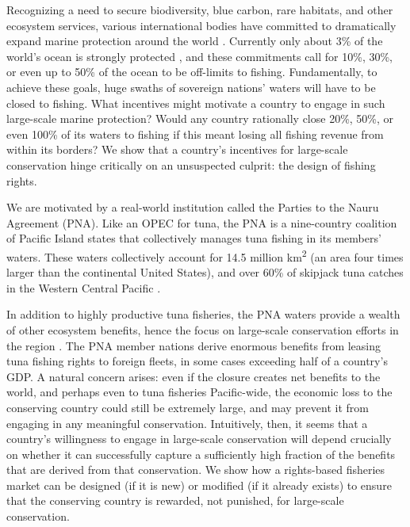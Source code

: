 \documentclass[12pt]{article}
\begin{document}



Recognizing a need to secure biodiversity, blue carbon, rare habitats, and other ecosystem services, various international bodies have committed to dramatically expand marine protection around the world \cite{dinerstein_2019}. Currently only about 3\% of the world's ocean is strongly protected \cite{sala_2018}, and these commitments call for 10\%, 30\%, or even up to 50\% of the ocean to be off-limits to fishing. Fundamentally, to achieve these goals, huge swaths of sovereign nations' waters will have to be closed to fishing. What incentives might motivate a country to engage in such large-scale marine protection? Would any country rationally close 20\%, 50\%, or even 100\% of its waters to fishing if this meant losing all fishing revenue from within its borders? We show that a country's incentives for large-scale conservation hinge critically on an unsuspected culprit: the design of fishing rights.

We are motivated by a real-world institution called the Parties to the Nauru Agreement (PNA). Like an OPEC for tuna, the PNA is a nine-country coalition of Pacific Island states that collectively manages tuna fishing in its members' waters\cite{havice_2013,aqorau_2018}. These waters collectively account for 14.5 million km\textsuperscript{2} (an area four times larger than the continental United States), and over 60\% of skipjack tuna catches in the Western Central Pacific \cite{havice_2013}.

In addition to highly productive tuna fisheries, the PNA waters provide a wealth of other ecosystem benefits, hence the focus on large-scale conservation efforts in the region \cite{mcleod_2019}. The PNA member nations derive enormous benefits from leasing tuna fishing rights to foreign fleets, in some cases exceeding half of a country's GDP. A natural concern arises: even if the closure creates net benefits to the world, and perhaps even to tuna fisheries Pacific-wide, the economic loss to the conserving country could still be extremely large, and may prevent it from engaging in any meaningful conservation. Intuitively, then, it seems that a country's willingness to engage in large-scale conservation will depend crucially on whether it can successfully capture a sufficiently high fraction of the benefits that are derived from that conservation. We show how a rights-based fisheries market can be designed (if it is new) or modified (if it already exists) to ensure that the conserving country is rewarded, not punished, for large-scale conservation.
\end{document}
